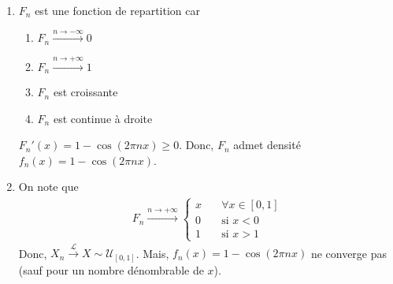 \documentclass[french]{article}
\begin{document}
	\begin{enumerate}
		\item
	$F_n$ est une fonction de repartition car
	\begin{enumerate}
		\item $F_n \xrightarrow{n \to -\infty} 0$
		\item $F_n \xrightarrow{n \to +\infty} 1$
		\item $F_n$ est croissante
		\item $F_n$ est continue à droite
	\end{enumerate}

	$F_n'(x) = 1 - \cos(2\pi n x) \geq 0$. Donc, $F_n$ admet densité $f_n(x) = 1 - \cos(2 \pi n x)$.
		
		\item	
	On note que 
	\begin{align}
		F_n \xrightarrow{n \to +\infty}
		\begin{cases}
		x \quad &\forall x \in [0,1]\\
		0 \quad &\text{si } x < 0\\
		1 \quad &\text{si } x >1
		\end{cases}
	\end{align}
	Donc, $X_n \xrightarrow{\mathcal{L}} X \sim \mathcal{U}_{[0,1]}$.
	Mais, $f_n(x) = 1 - \cos(2 \pi nx)$ ne converge pas (sauf pour un nombre dénombrable de $x$).
	\end{enumerate}
	
\end{document}
